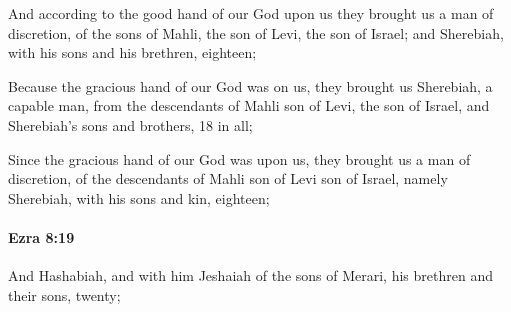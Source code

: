 			\begin{versebox}
					\item[BHS] 
					\item[LXX] 
					\item[ASV] And according to the good hand of our God upon us they brought us a man of discretion, of the sons of Mahli, the son of Levi, the son of Israel; and Sherebiah, with his sons and his brethren, eighteen;
					\item[NIV] Because the gracious hand of our God was on us, they brought us Sherebiah, a capable man, from the descendants of Mahli son of Levi, the son of Israel, and Sherebiah’s sons and brothers, 18 in all;
					\item[NRSV] Since the gracious hand of our God was upon us, they brought us a man of discretion, of the descendants of Mahli son of Levi son of Israel, namely Sherebiah, with his sons and kin, eighteen;
			\end{versebox}

		\paragraph{Ezra 8:19} %
			\label{EZRA-8-19}

			And Hashabiah, and with him Jeshaiah of the sons of Merari, his brethren and their sons, twenty;

